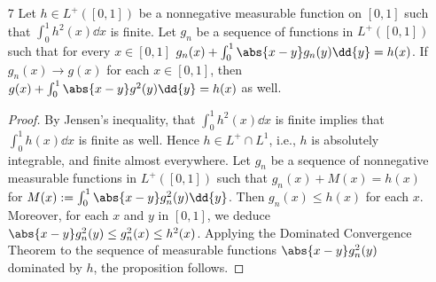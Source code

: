 \documentclass[onesided]{ccg-pset}
\author{Colton Grainger}
\date{\today}
\begin{document}
\maketitle

\begin{enumerate}

\item[7] Let $h \in L^+([0,1])$ be a nonnegative measurable function on $[0,1]$ such that $\int_0^1 h^2(x)\dd{x}$ is finite. Let $g_n$ be a sequence of functions in $L^+([0,1])$ such that for every $x \in [0,1]$ $g_n(x) + \int_0^1\abs{x-y}g_n(y)\dd{y} = h(x)$. If $g_n(x) \to g(x)$ for each $x \in [0,1]$, then $g(x) + \int_0^1 \abs{x-y}g^2(y)\dd{y} = h(x)$ as well.

\begin{proof}
    By Jensen's inequality, that $\int_0^1 h^2(x) \dd{x}$ is finite implies that $\int_0^1 h(x)\dd{x}$ is finite as well. Hence $h \in L^+ \cap L^1$, i.e., $h$ is absolutely integrable, and finite almost everywhere. Let $g_n$ be a sequence of nonnegative measurable functions in $L^+([0,1])$ such that $g_n(x) + M(x) = h(x)$ for $M(x) := \int_0^1 \abs{x-y}g_n^2(y)\dd{y}$. Then $g_n(x) \le h(x)$ for each $x$. Moreover, for each $x$ and $y$ in $[0,1]$, we deduce $\abs{x-y}g_n^2(y) \le g_n^2(x) \le h^2(x)$. Applying the Dominated Convergence Theorem to the sequence of measurable functions $\abs{x-y}g_n^2(y)$ dominated by $h$, the proposition follows.
\end{proof}

\end{enumerate}
\end{document}
